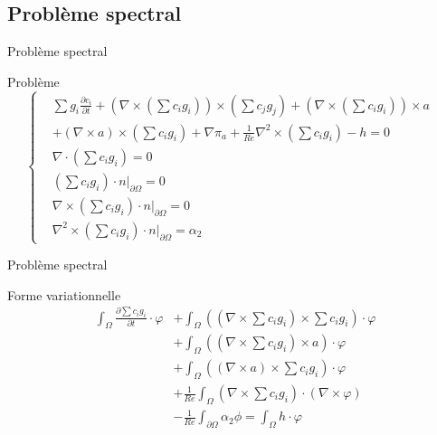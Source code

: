 \documentclass{beamer}
\newcommand{\grad}{{\nabla}}
\newcommand{\rot}{{\nabla\times}}
\newcommand{\rott}{{\nabla^2\times}}
\newcommand{\diverg}{{\nabla\cdot}}
\newcommand{\restr}{{\big\rvert_{\partial\Omega}}}
\begin{document}
\subsection{Problème spectral}
\begin{frame}{Problème spectral}
\begin{block}{Problème}
\[
\left\{
\begin{aligned}
&\sum g_i\frac{\partial c_i}{\partial t} + \left(\rot\left(\sum c_ig_i\right)\right)\times\left(\sum c_jg_j\right)+\left(\rot\left(\sum c_ig_i\right)\right)\times a&\\
&+ \left(\rot a\right)\times\left(\sum c_ig_i\right) + \grad\pi_a + \frac{1}{Re}\rott\left(\sum c_ig_i\right) - h = 0\\
&\diverg\left(\sum c_ig_i\right) = 0\\
&\left(\sum c_ig_i\right)\cdot n\restr = 0\\
&\rot\left(\sum c_ig_i\right)\cdot n\restr = 0\\
&\rott\left(\sum c_ig_i\right)\cdot n\restr = \alpha_2
\end{aligned}
\right.
\]
\end{block}
\end{frame}

\begin{frame}{Problème spectral}
\begin{block}{Forme variationnelle}
\[
\begin{aligned}
\int_\Omega \frac{\partial \sum c_ig_i}{\partial t}\cdot \varphi &+ \int_\Omega ((\rot \sum c_ig_i)\times \sum c_ig_i)\cdot \varphi \\
&+ \int_\Omega ((\rot \sum c_ig_i)\times a)\cdot\varphi \\
&+ \int_\Omega ((\rot a)\times \sum c_ig_i)\cdot\varphi \\
&+ \frac{1}{Re}\int_\Omega (\rot \sum c_ig_i)\cdot(\rot\varphi) \\
&-\frac{1}{Re}\int_{\partial\Omega} \alpha_2\phi = \int_\Omega h\cdot\varphi
\end{aligned}
\]
\end{block}
\end{frame}
\end{document}
